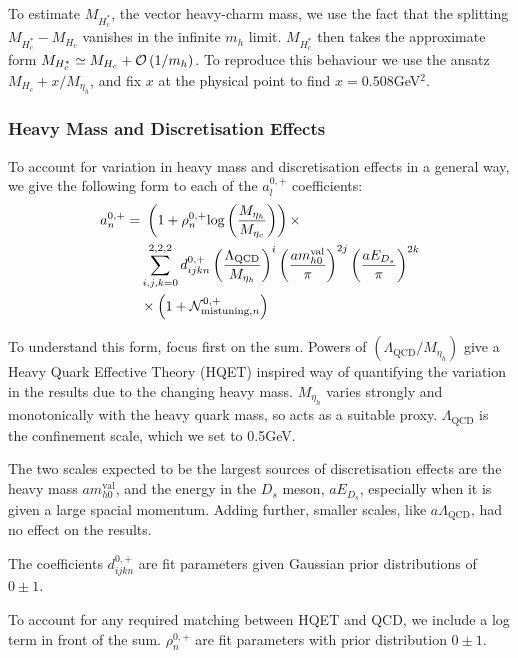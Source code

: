 To estimate $M_{H^*_c}$, the vector heavy-charm mass, we use the fact that the splitting $ M_{H_c^*} - M_{H_c}$ vanishes in the infinite $m_h$ limit. $M_{H_c^*}$ then takes the approximate form $M_{H_c^*} \simeq M_{H_c} + \mathcal{O}\left( 1/m_h \right)$. To reproduce this behaviour we use the ansatz $M_{H_c} + x/M_{\eta_h}$, and fix $x$ at the physical point to find $x=0.508$GeV$^2$.

\subsubsection{Heavy Mass and Discretisation Effects}

To account for variation in heavy mass and discretisation effects in a general way, we give the following form to each of the $a_l^{0,+}$ coefficients:
\begin{align}
  \nonumber  a_n^{0,+} = & \,\,\left( 1 + \rho^{0,+}_n \text{log}\left(M_{\eta_h}\over M_{\eta_c}\right)\right) \times \\ \nonumber
  &\sum_{i,j,k = 0}^{2,2,2} d^{0,+}_{ijkn} \left({\Lambda_{\text{QCD}}\over M_{\eta_h} }\right)^{i} \left({ am^{\text{val}}_{h0} \over \pi }\right)^{2j} \left({ aE_{D_s} \over \pi }\right)^{2k} \\ &\times\left(1 + \mathcal{N}_{\text{mistuning},n}^{0,+} \right)
      \label{eq:mhfitfun}
\end{align}

To understand this form, focus first on the sum. Powers of $(\Lambda_{\text{QCD}}/M_{\eta_h})$ give a Heavy Quark Effective Theory (HQET) inspired way of quantifying the variation in the results due to the changing heavy mass. $M_{\eta_h}$ varies strongly and monotonically with the heavy quark mass, so acts as a suitable proxy. $\Lambda_{\text{QCD}}$ is the confinement scale, which we set to 0.5GeV.

The two scales expected to be the largest sources of discretisation effects are the heavy mass $am_{h0}^{\text{val}}$, and the energy in the $D_s$ meson, $aE_{D_s}$, especially when it is given a large spacial momentum. Adding further, smaller scales, like $a\Lambda_{\text{QCD}}$, had no effect on the results.

The coefficients $d^{0,+}_{ijkn}$ are fit parameters given Gaussian prior distributions of $0\pm 1$.

To account for any required matching between HQET and QCD, we include a log term in front of the sum. $\rho^{0,+}_n$ are fit parameters with prior distribution $0\pm 1$.

